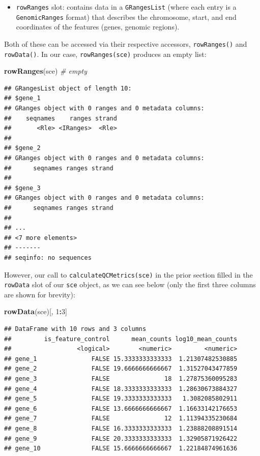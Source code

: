 \documentclass[]{book}
\newenvironment{Shaded}{\begin{snugshade}}{\end{snugshade}}
\newcommand{\CommentTok}[1]{\textcolor[rgb]{0.56,0.35,0.01}{\textit{#1}}}
\newcommand{\DecValTok}[1]{\textcolor[rgb]{0.00,0.00,0.81}{#1}}
\newcommand{\KeywordTok}[1]{\textcolor[rgb]{0.13,0.29,0.53}{\textbf{#1}}}
\newcommand{\NormalTok}[1]{#1}
\newcommand{\OperatorTok}[1]{\textcolor[rgb]{0.81,0.36,0.00}{\textbf{#1}}}
\providecommand{\tightlist}{%
  \setlength{\itemsep}{0pt}\setlength{\parskip}{0pt}}
\begin{document}
\begin{itemize}
\tightlist
\item
  \texttt{rowRanges} slot: contains data in a \texttt{GRangesList} (where each entry is a \texttt{GenomicRanges} format) that describes the chromosome, start, and end coordinates of the features (genes, genomic regions).
\end{itemize}

Both of these can be accessed via their respective accessors, \texttt{rowRanges()} and \texttt{rowData()}. In our case, \texttt{rowRanges(sce)} produces an empty list:

\begin{Shaded}
\begin{Highlighting}[]
\KeywordTok{rowRanges}\NormalTok{(sce) }\CommentTok{# empty}
\end{Highlighting}
\end{Shaded}

\begin{verbatim}
## GRangesList object of length 10:
## $gene_1 
## GRanges object with 0 ranges and 0 metadata columns:
##    seqnames    ranges strand
##       <Rle> <IRanges>  <Rle>
## 
## $gene_2 
## GRanges object with 0 ranges and 0 metadata columns:
##      seqnames ranges strand
## 
## $gene_3 
## GRanges object with 0 ranges and 0 metadata columns:
##      seqnames ranges strand
## 
## ...
## <7 more elements>
## -------
## seqinfo: no sequences
\end{verbatim}

However, our call to \texttt{calculateQCMetrics(sce)} in the prior section filled in the \texttt{rowData} slot of our \texttt{sce} object, as we can see below (only the first three columns are shown for brevity):

\begin{Shaded}
\begin{Highlighting}[]
\KeywordTok{rowData}\NormalTok{(sce)[, }\DecValTok{1}\OperatorTok{:}\DecValTok{3}\NormalTok{]}
\end{Highlighting}
\end{Shaded}

\begin{verbatim}
## DataFrame with 10 rows and 3 columns
##         is_feature_control      mean_counts log10_mean_counts
##                  <logical>        <numeric>         <numeric>
## gene_1               FALSE 15.3333333333333  1.21307482530885
## gene_2               FALSE 19.6666666666667  1.31527043477859
## gene_3               FALSE               18  1.27875360095283
## gene_4               FALSE 18.3333333333333  1.28630673884327
## gene_5               FALSE 19.3333333333333   1.3082085802911
## gene_6               FALSE 13.6666666666667  1.16633142176653
## gene_7               FALSE               12  1.11394335230684
## gene_8               FALSE 16.3333333333333  1.23888208891514
## gene_9               FALSE 20.3333333333333  1.32905871926422
## gene_10              FALSE 15.6666666666667  1.22184874961636
\end{verbatim}
\end{document}

